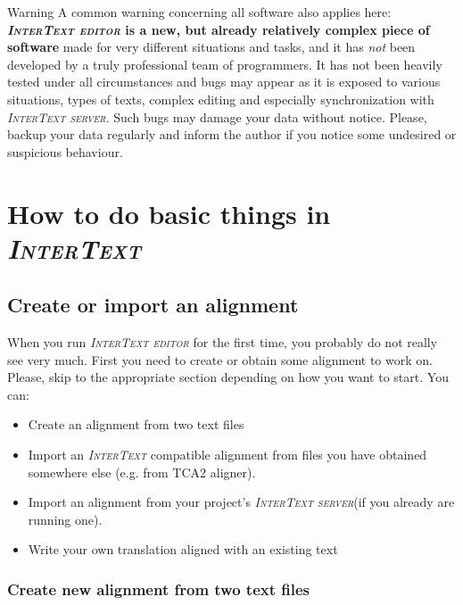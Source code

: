 \documentclass[a4paper,10pt,oneside]{book}
\newcommand{\IT}{\textit{\textsc{InterText}}\xspace}
\newcommand{\ITeditor}{\textit{\textsc{InterText editor}}\xspace}
\newcommand{\ITserver}{\textit{\textsc{InterText server}}\xspace}
\begin{document}
\medskip
\begin{bclogo}[couleur = blue!30, arrondi = 0.1, logo = \bcattention,
ombre = true , epOmbre = 0.125, couleurOmbre = black!30, blur, epBord = 0.3, marge = 5]{Warning}\small
A common warning concerning all software also applies here: \textbf{\ITeditor is a new, but already relatively complex piece of software} made for very different situations and tasks, and it has \emph{not} been developed by a truly professional team of programmers. It has not been heavily tested under all circumstances and bugs may appear as it is exposed to various situations, types of texts, complex editing and especially synchronization with \ITserver. Such bugs may damage your data without notice. Please, backup your data regularly and inform the author if you notice some undesired or suspicious behaviour.
\end{bclogo}


\part{How to do basic things in \IT}\label{ch:howto}

\chapter{Create or import an alignment}\label{ch:howto:newalignment}

When you run \ITeditor for the first time, you probably do not really see very much. First you need to create or obtain some alignment to work on. Please, skip to the appropriate section depending on how you want to start. You can:
\begin{itemize}
	\item Create an alignment from two text files
	\item Import an \IT compatible alignment from files you have obtained somewhere else (e.g. from TCA2 aligner).
	\item Import an alignment from your project's \ITserver (if you already are running one).
  \item Write your own translation aligned with an existing text
\end{itemize}

\section{Create new alignment from two text files}\label{ch:howto:createfromtext}
\end{document}
